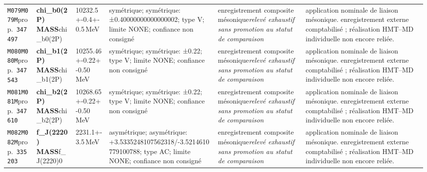 \begin{landscape}
\begin{longtable}{L{1.85cm}L{4.45cm}L{2.35cm}L{4.05cm}L{3.35cm}L{7.15cm}}
\texttt{M079}\newline \texttt{M079M}\newline prop.\ \texttt{347497} & \textbf{chi\_\allowbreak{}b0(2P) MASS}\newline chi\_\allowbreak{}b0(2P) & 10232.5+-0.4+-0.5\,MeV & symétrique; symétrique: ±0.40000000000000002; type V; limite NONE; confiance non consigné & enregistrement composite mésonique\newline \emph{relevé exhaustif sans promotion au statut de comparaison} & application nominale de liaison mésonique. enregistrement externe comptabilisé ; réalisation HMT--MD individuelle non encore reliée. \\
\texttt{M080}\newline \texttt{M080M}\newline prop.\ \texttt{347543} & \textbf{chi\_\allowbreak{}b1(2P) MASS}\newline chi\_\allowbreak{}b1(2P) & 10255.46+-0.22+-0.50\,MeV & symétrique; symétrique: ±0.22; type V; limite NONE; confiance non consigné & enregistrement composite mésonique\newline \emph{relevé exhaustif sans promotion au statut de comparaison} & application nominale de liaison mésonique. enregistrement externe comptabilisé ; réalisation HMT--MD individuelle non encore reliée. \\
\texttt{M081}\newline \texttt{M081M}\newline prop.\ \texttt{347610} & \textbf{chi\_\allowbreak{}b2(2P) MASS}\newline chi\_\allowbreak{}b2(2P) & 10268.65+-0.22+-0.50\,MeV & symétrique; symétrique: ±0.22; type V; limite NONE; confiance non consigné & enregistrement composite mésonique\newline \emph{relevé exhaustif sans promotion au statut de comparaison} & application nominale de liaison mésonique. enregistrement externe comptabilisé ; réalisation HMT--MD individuelle non encore reliée. \\
\texttt{M082}\newline \texttt{M082M}\newline prop.\ \texttt{335203} & \textbf{f\_\allowbreak{}J(2220) MASS}\newline f\_\allowbreak{}J(2220)0 & 2231.1+-3.5\,MeV & asymétrique; asymétrique: +3.5335248107562318/-3.5214610779100788; type AC; limite NONE; confiance non consigné & enregistrement composite mésonique\newline \emph{relevé exhaustif sans promotion au statut de comparaison} & application nominale de liaison mésonique. enregistrement externe comptabilisé ; réalisation HMT--MD individuelle non encore reliée. \\

\end{longtable}
\end{landscape}
